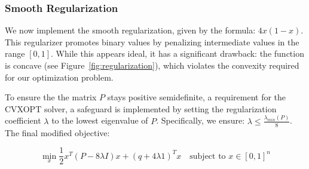 \subsubsection{Smooth Regularization}

We now implement the smooth regularization, given by the formula: \(4x(1-x)\). This regularizer promotes binary values by penalizing intermediate values in the range \(\left[0, 1\right]\). While this appears ideal, it has a significant drawback: the function is concave (see Figure~\ref{fig:regularization}), which violates the convexity required for our optimization problem.

To ensure the the matrix \(P\) stays positive semidefinite, a requirement for the CVXOPT solver, a safeguard is implemented by setting the regularization coefficient \(\lambda\) to the lowest eigenvalue of \(P\). Specifically, we ensure: \(\lambda \leq \frac{\lambda_{min}(P)}{8}\). The final modified objective:

\begin{equation}
\label{eq:qp_smooth}
\min_{x} \frac{1}{2} x^T(P - 8 \lambda I)x + (q + 4\lambda1)^Tx \quad \text{subject to } x \in [0,1]^n
\end{equation}

